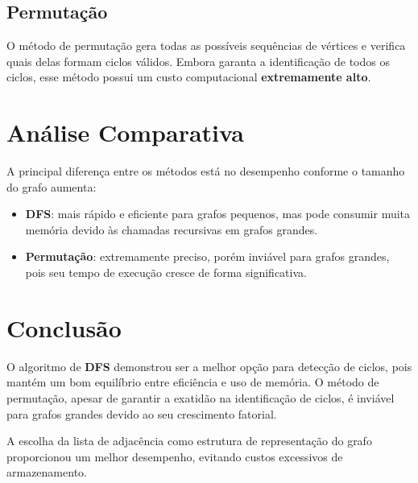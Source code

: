 \documentclass[a4paper,12pt]{article}
\begin{document}
\subsection{Permutação}
O método de permutação gera todas as possíveis sequências de vértices e verifica quais delas formam ciclos válidos. Embora garanta a identificação de todos os ciclos, esse método possui um custo computacional \textbf{extremamente alto}.

\newpage

\section{Análise Comparativa}

A principal diferença entre os métodos está no desempenho conforme o tamanho do grafo aumenta:

\begin{itemize}
    \item \textbf{DFS}: mais rápido e eficiente para grafos pequenos, mas pode consumir muita memória devido às chamadas recursivas em grafos grandes.
    \item \textbf{Permutação}: extremamente preciso, porém inviável para grafos grandes, pois seu tempo de execução cresce de forma significativa.
\end{itemize}

\newpage

\section{Conclusão}

O algoritmo de \textbf{DFS} demonstrou ser a melhor opção para detecção de ciclos, pois mantém um bom equilíbrio entre eficiência e uso de memória. O método de permutação, apesar de garantir a exatidão na identificação de ciclos, é inviável para grafos grandes devido ao seu crescimento fatorial.

A escolha da lista de adjacência como estrutura de representação do grafo proporcionou um melhor desempenho, evitando custos excessivos de armazenamento.
\end{document}
